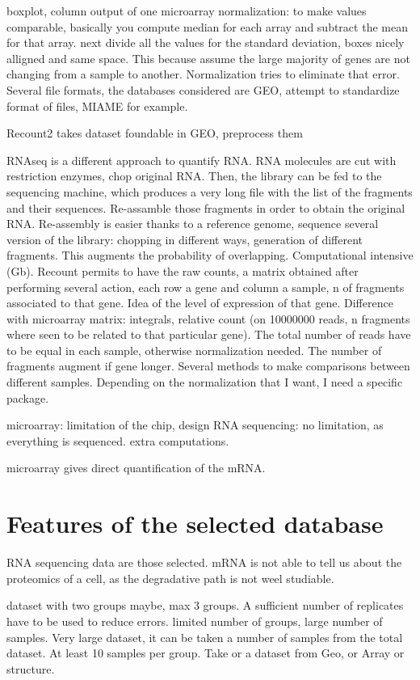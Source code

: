 boxplot, column output of one microarray
normalization: to make values comparable, basically you compute median for each array and subtract the mean for that array. next divide all the values for the standard deviation, boxes nicely alligned and same space. This because assume the large majority of genes are not changing from a sample to another. Normalization tries to eliminate that error. Several file formats, the databases considered are GEO, attempt to standardize format of files, MIAME for example.

Recount2 takes dataset foundable in GEO, preprocess them

RNAseq is a different approach to quantify RNA. RNA molecules are cut with restriction enzymes, chop original RNA. Then, the library can be fed to the sequencing machine, which produces a very long file with the list of the fragments and their sequences. Re-assamble those fragments in order to obtain the original RNA. Re-assembly is easier thanks to a reference genome, sequence several version of the library: chopping in different ways, generation of different fragments. This augments the probability of overlapping. Computational intensive (Gb). Recount permits to have the raw counts, a matrix obtained after performing several action, each row a gene and column a sample, n of fragments associated to that gene. 
Idea of the level of expression of that gene. Difference with microarray matrix: integrals, relative count (on 10000000 reads, n fragments where seen to be related to that particular gene). The total number of reads have to be equal in each sample, otherwise normalization needed. The number of fragments augment if gene longer. Several methods to make comparisons between different samples. 
Depending on the normalization that I want, I need a specific package. 

microarray: limitation of the chip, design
RNA sequencing: no limitation, as everything is sequenced. extra computations.

microarray gives direct quantification of the mRNA. %


\section{Features of the selected database}
RNA sequencing data are those selected. mRNA is not able to tell us about the proteomics of a cell, as the degradative path is not weel studiable. 


dataset with two groups maybe, max 3 groups. A sufficient number of replicates have to be used to reduce errors. limited number of groups, large number of samples. Very large dataset, it can be taken a number of samples from the total dataset. At least 10 samples per group. Take or a dataset from Geo, or Array or structure.

